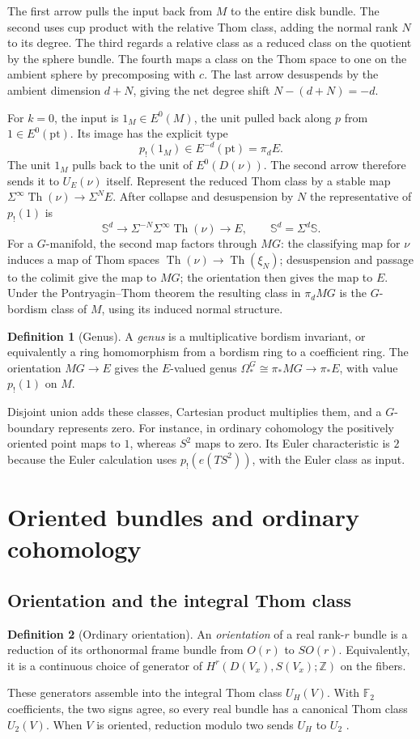 \documentclass[11pt]{article}
\theoremstyle{definition}
\newtheorem{defn}{Definition}[section]
\newcommand{\Th}{\operatorname{Th}}
\newcommand{\F}{\mathbb F}
\newcommand{\Z}{\mathbb Z}
\begin{document}
The first arrow pulls the input back from \(M\) to the entire disk bundle. The second uses cup product with the relative Thom class, adding the normal rank \(N\) to its degree. The third regards a relative class as a reduced class on the quotient by the sphere bundle. The fourth maps a class on the Thom space to one on the ambient sphere by precomposing with \(c\). The last arrow desuspends by the ambient dimension \(d+N\), giving the net degree shift \(N-(d+N)=-d\).

For \(k=0\), the input is \(1_M\in E^0(M)\), the unit pulled back along \(p\) from \(1\in E^0(\mathrm{pt})\). Its image has the explicit type
\[
 p_!(1_M)\in E^{-d}(\mathrm{pt})=\pi_dE.
\]
The unit \(1_M\) pulls back to the unit of \(E^0(D(\nu))\). The second arrow therefore sends it to \(U_E(\nu)\) itself. Represent the reduced Thom class by a stable map \(\Sigma^\infty\Th(\nu)\to\Sigma^N E\). After collapse and desuspension by \(N\) the representative of \(p_!(1)\) is
\[
 \mathbb S^d\longrightarrow \Sigma^{-N}\Sigma^\infty\Th(\nu)\longrightarrow E,
 \qquad \mathbb S^d=\Sigma^d\mathbb S.
\]
For a \(G\)-manifold, the second map factors through \(MG\): the classifying map for \(\nu\) induces a map of Thom spaces \(\Th(\nu)\to\Th(\xi_N)\); desuspension and passage to the colimit give the map to \(MG\); the orientation then gives the map to \(E\). Under the Pontryagin--Thom theorem the resulting class in \(\pi_dMG\) is the \(G\)-bordism class of \(M\), using its induced normal structure.

\begin{defn}[Genus]
A \emph{genus} is a multiplicative bordism invariant, or equivalently a ring homomorphism from a bordism ring to a coefficient ring. The orientation \(MG\to E\) gives the \(E\)-valued genus \(\Omega_*^G\cong\pi_*MG\to\pi_*E\), with value \(p_!(1)\) on \(M\).
\end{defn}
Disjoint union adds these classes, Cartesian product multiplies them, and a \(G\)-boundary represents zero. For instance, in ordinary cohomology the positively oriented point maps to \(1\), whereas \(S^2\) maps to zero. Its Euler characteristic is \(2\) because the Euler calculation uses \(p_!(e(TS^2))\), with the Euler class as input.

\section{Oriented bundles and ordinary cohomology}
\subsection{Orientation and the integral Thom class}
\begin{defn}[Ordinary orientation]
An \emph{orientation} of a real rank-\(r\) bundle is a reduction of its orthonormal frame bundle from \(O(r)\) to \(SO(r)\). Equivalently, it is a continuous choice of generator of \(H^r(D(V_x),S(V_x);\Z)\) on the fibers.
\end{defn}
These generators assemble into the integral Thom class \(U_H(V)\). With \(\F_2\) coefficients, the two signs agree, so every real bundle has a canonical Thom class \(U_2(V)\). When \(V\) is oriented, reduction modulo two sends \(U_H\) to \(U_2\) \cite[\S\S8--10]{MS}.
\end{document}
